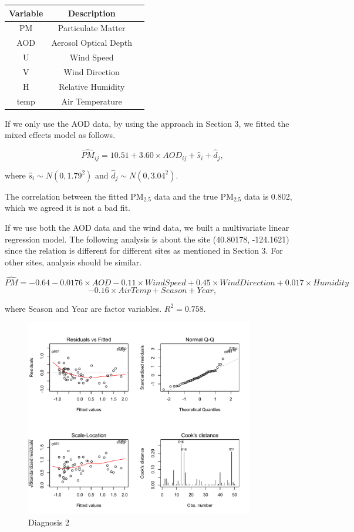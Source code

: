 \documentclass[10pt]{article}
\begin{document}
\begin{table}[H] 
\centering
\begin{tabular}{|c|c|c|}
\hline
Variable & Description \\ 
\hline
PM & Particulate Matter \\
AOD & Aerosol Optical Depth \\
U & Wind Speed \\
V & Wind Direction \\
H & Relative Humidity \\
temp & Air Temperature \\
\hline
\end{tabular}
\end{table}


If we only use the AOD data, by using the approach in Section 3, we fitted the mixed effects model as follows.

$$\hat{PM}_{ij} = 10.51 + 3.60\times AOD_{ij} + \hat{s}_i + \hat{d}_j, $$

where $\hat{s}_i\sim N(0, 1.79^2)$ and $\hat{d}_j\sim N(0, 3.04^2)$. 

The correlation between the fitted PM$_{2.5}$ data and the true PM$_{2.5}$ data is 0.802, which we agreed it is not a bad fit. 

If we use both the AOD data and the wind data, we built a multivariate linear regression model. 
The following analysis is about the site (40.80178, -124.1621) since the relation is different for different sites as mentioned in Section 3. For other sites, analysis should be similar. 

$$\hat{PM} = -0.64 - 0.0176\times AOD - 0.11\times WindSpeed + 0.45\times WindDirection + 0.017\times Humidity$$
$$ - 0.16\times AirTemp + Season + Year, $$

where Season and Year are factor variables. $R^2 = 0.758$.

\begin{figure}[H]
\centering
\includegraphics[width = 100mm]{residual.pdf}
\caption{Diagnosis 2}
\label{d1}
\end{figure}
\end{document}
